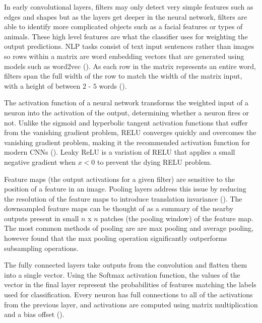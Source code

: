 In early convolutional layers, filters may only detect very simple features such as edges and shapes but as the layers get deeper in the neural network, filters are able to identify more complicated objects such as a facial features or types of animals. These high level features are what the classifier uses for weighting the output predictions.
\acrshort{NLP} tasks consist of text input sentences rather than images so rows within a matrix are word embedding vectors that are generated using models such as word2vec (\cite{mikolov_word2vec_2013}). 
As each row in the matrix represents an entire word, filters span the full width of the row to match the width of the matrix input, with a height of between $2$ - $5$ words (\cite{lopez_deep_2017}).

The activation function of a neural network transforms the weighted input of a neuron into the activation of the output, determining whether a neuron fires or not. Unlike the sigmoid and hyperbolic tangent activation functions that suffer from the vanishing gradient problem, \acrfull{RELU} converges quickly and overcomes the vanishing gradient problem, making it the recommended activation function for modern \acrshort{CNN}s (\cite{nair_rectified_2010}). 
Leaky ReLU is a variation of \acrshort{RELU} that applies a small negative gradient when $x < 0$ to prevent the dying \acrshort{RELU} problem.

Feature maps (the output activations for a given filter) are sensitive to the position of a feature in an image. Pooling layers address this issue by reducing the resolution of the feature maps to introduce translation invariance (\cite{scherer_evaluation_2010}). The downsampled feature maps can be thought of as a summary of the nearby outputs present in small $n$ x $n$ patches (the pooling window) of the feature map. The most common methods of pooling are are max pooling and average pooling, however \cite{scherer_evaluation_2010} found that the max pooling operation significantly outperforms subsampling operations.

The fully connected layers take outputs from the convolution and flatten them into a single vector. Using the Softmax activation function, the values of the vector in the final layer represent the probabilities of features matching the labels used for classification. Every neuron has full connections to all of the activations from the previous layer, and activations are computed using matrix multiplication and a bias offset (\cite{stanford_cs231n_2019}).

